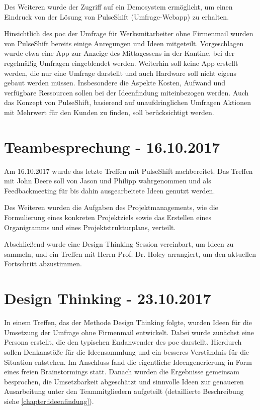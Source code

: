 Des Weiteren wurde der Zugriff auf ein Demosystem ermöglicht, um einen Eindruck von der Lösung von PulseShift (Umfrage-Webapp) zu erhalten.

Hinsichtlich des \gls{poc} der Umfrage für Werksmitarbeiter ohne Firmenmail wurden von PulseShift bereits einige Anregungen und Ideen mitgeteilt. Vorgeschlagen wurde etwa eine App zur Anzeige des Mittagessens in der Kantine, bei der regelmäßig Umfragen eingeblendet werden. Weiterhin soll keine App erstellt werden, die nur eine Umfrage darstellt und auch Hardware soll nicht eigens gebaut werden müssen. Insbesondere die Aspekte Kosten, Aufwand und verfügbare Ressourcen sollen bei der Ideenfindung miteinbezogen werden. Auch das Konzept von PulseShift, basierend auf unaufdringlichen Umfragen Aktionen mit Mehrwert für den Kunden zu finden, soll berücksichtigt werden.

\section{Teambesprechung - 16.10.2017}
Am 16.10.2017 wurde das letzte Treffen mit PulseShift nachbereitet. Das Treffen mit John Deere soll von Jason und Philipp wahrgenommen und als Feedbackmeeting für bis dahin ausgearbeitete Ideen genutzt werden.

Des Weiteren wurden die Aufgaben des Projektmanagements, wie die Formulierung eines konkreten Projektziels sowie das Erstellen eines Organigramms und eines Projektstrukturplans, verteilt.

Abschließend wurde eine Design Thinking Session vereinbart, um Ideen zu sammeln, und ein Treffen mit Herrn Prof. Dr. Holey arrangiert, um den aktuellen Fortschritt abzustimmen.

\section{Design Thinking - 23.10.2017}
In einem Treffen, das der Methode Design Thinking folgte, wurden Ideen für die Umsetzung der Umfrage ohne Firmenmail entwickelt. Dabei wurde zunächst eine Persona erstellt, die den typischen Endanwender des \gls{poc} darstellt. Hierdurch sollen Denkanstöße für die Ideensammlung und ein besseres Verständnis für die Situation entstehen. Im Anschluss fand die eigentliche Ideengenerierung in Form eines freien Brainstormings statt. Danach wurden die Ergebnisse gemeinsam besprochen, die Umsetzbarkeit abgeschätzt und sinnvolle Ideen zur genaueren Ausarbeitung unter den Teammitgliedern aufgeteilt (detaillierte Beschreibung siehe \vref{chapter:ideenfindung}).

